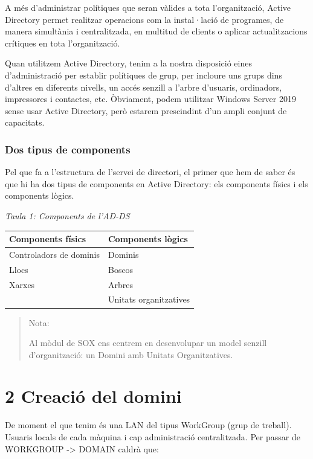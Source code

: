 \documentclass[
  a4paper,
]{article}
\begin{document}
A més d'administrar polítiques que seran vàlides a tota l'organització,
Active Directory permet realitzar operacions com la instal·lació de
programes, de manera simultània i centralitzada, en multitud de clients
o aplicar actualitzacions crítiques en tota l'organització.

Quan utilitzem Active Directory, tenim a la nostra disposició eines
d'administració per establir polítiques de grup, per incloure uns grups
dins d'altres en diferents nivells, un accés senzill a l'arbre
d'usuaris, ordinadors, impressores i contactes, etc. Òbviament, podem
utilitzar Windows Server 2019 sense usar Active Directory, però estarem
prescindint d'un ampli conjunt de capacitats.

\subsubsection{Dos tipus de components}\label{dos-tipus-de-components}

Pel que fa a l'estructura de l'servei de directori, el primer que hem de
saber és que hi ha dos tipus de components en Active Directory: els
components físics i els components lògics.

\emph{Taula 1: Components de l'AD-DS}

\begin{longtable}[]{@{}ll@{}}
\toprule\noalign{}
Components físics & Components lògics \\
\midrule\noalign{}
\endhead
\bottomrule\noalign{}
\endlastfoot
Controladors de dominis & Dominis \\
Llocs & Boscos \\
Xarxes & Arbres \\
& Unitats organitzatives \\
\end{longtable}

\begin{quote}
Nota:

Al mòdul de SOX ens centrem en desenvolupar un model senzill
d'organització: un Domini amb Unitats Organitzatives.
\end{quote}

\section{2 Creació del domini}\label{creaciuxf3-del-domini}

De moment el que tenim és una LAN del tipus WorkGroup (grup de treball).
Usuaris locals de cada màquina i cap administració centralitzada. Per
passar de WORKGROUP -\textgreater{} DOMAIN caldrà que:
\end{document}

